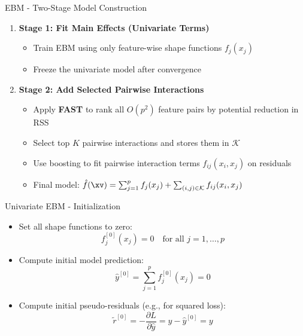 \documentclass[11pt,compress,t,notes=noshow, aspectratio=169, xcolor=table]{beamer}
\begin{document}
\begin{frame}{EBM - Two-Stage Model Construction}
\begin{enumerate}
    \item \textbf{Stage 1: Fit Main Effects (Univariate Terms) }
    \begin{itemize}
        \item Train EBM using only feature-wise shape functions $f_j(x_j)$
        \item Freeze the univariate model after convergence
    \end{itemize}
    
    \item \textbf{Stage 2: Add Selected Pairwise Interactions }
    \begin{itemize}
        \item Apply \textbf{FAST} to rank all $O(p^2)$ feature pairs by potential reduction in RSS
        \item Select top $K$ pairwise interactions and stores them in $\mathcal{K}$
        \item Use boosting to fit pairwise interaction terms $f_{ij}(x_i, x_j)$ on residuals
        \item Final model: $\hat{f}(\xv) = \sum_{j=1}^p f_j(x_j) + \sum_{(i,j)\in\mathcal{K}} f_{ij}(x_i, x_j)$
    \end{itemize}
\end{enumerate}

\end{frame}



\begin{frame}{Univariate EBM - Initialization}

\begin{itemize}
    \item Set all shape functions to zero:
    $$
    f_j^{[0]}(x_j) = 0 \quad \text{for all } j = 1, \dots, p
    $$
    \item Compute initial model prediction:
    $$
    \hat{y}^{[0]} = \sum_{j=1}^p f_j^{[0]}(x_j) = 0
    $$
    \item Compute initial pseudo-residuals (e.g., for squared loss):
    $$
    \tilde{r}^{[0]} = -\frac{\partial L}{\partial \hat{y}} = y - \hat{y}^{[0]} = y
    $$
\end{itemize}

\end{frame}
\end{document}
